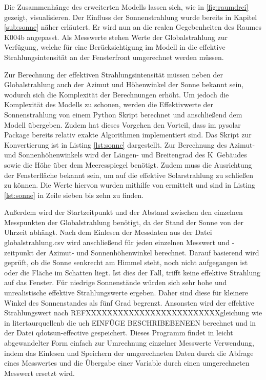 Die Zusammenhänge des erweiterten Modells lassen sich, wie in \ref{fig:raumdrei} gezeigt, visualisieren. Der Einfluss der Sonnenstrahlung wurde bereits in Kapitel \ref{sub:sonne} näher erläutert. Er wird nun an die realen Gegebenheiten des Raumes K004b angepasst. Als Messwerte stehen Werte der Globalstrahlung zur Verfügung, welche für eine Berücksichtigung im Modell in die effektive Strahlungsintensität an der Fensterfront umgerechnet werden müssen.

Zur Berechnung der effektiven Strahlungsintensität müssen neben der Globalstrahlung auch der Azimut und Höhenwinkel der Sonne bekannt sein, wodurch sich die Komplexität der Berechnungen erhöht. Um jedoch die Komplexität des Modells zu schonen, werden die Effektivwerte der Sonnenstrahlung von einem Python Skript berechnet und anschließend dem Modell übergeben. Zudem hat dieses Vorgehen den Vorteil, dass im pysolar Package bereits relativ exakte Algorithmen implementiert sind. 
Das Skript zur Konvertierung ist in Listing \ref{lst:sonne} dargestellt. 
Zur Berechnung des Azimut- und Sonnenhöhenwinkels wird der Längen- und Breitengrad des K~Gebäudes sowie die Höhe über dem Meeresspiegel benötigt. Zudem muss die Ausrichtung der Fensterfläche bekannt sein, um auf die effektive Solarstrahlung zu schließen zu können. Die Werte hiervon wurden mithilfe von \cite{go15} ermittelt und sind in Listing \ref{lst:sonne} in Zeile sieben bis zehn zu finden.



Außerdem wird der Startzeitpunkt und der Abstand zwischen den einzelnen Messpunkten der Globalstrahlung benötigt, da der Stand der Sonne von der Uhrzeit abhängt. Nach dem Einlesen der Messdaten aus der Datei globalstrahlung.csv wird anschließend für jeden einzelnen Messwert und -zeitpunkt der Azimut- und Sonnenhöhenwinkel berechnet. Darauf basierend wird geprüft, ob die Sonne senkrecht am Himmel steht, noch nicht aufgegangen ist oder die Fläche im Schatten liegt. Ist dies der Fall, trifft keine effektive Strahlung auf das Fenster. Für niedrige Sonnenstände würden sich sehr hohe und unrealistische effektive Strahlungswerte ergeben. Daher sind diese für kleinere Winkel des Sonnenstandes als fünf Grad begrenzt.
Ansonsten wird der effektive Strahlungswert nach REFXXXXXXXXXXXXXXXXXXXXXXXXXgleichung wie in litertaurquellenb die uch EINFÜGE BESCHRIBEBENEEN berechnet und in der Datei qdotsun-effective gespeichert. Dieses Programm findet in leicht abgewandelter Form einfach zur Umrechnung einzelner Messwerte Verwendung, indem das Einlesen und Speichern der umgerechneten Daten durch die Abfrage eines Messwertes und die Übergabe einer Variable durch einen umgerechneten Messwert ersetzt wird.

